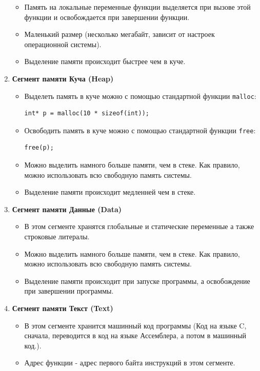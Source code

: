 \documentclass{article}
\begin{document}
\begin{multicols}{2}
\begin{enumerate}
\begin{itemize}
\item Память на локальные переменные функции выделяется при вызове этой функции и освобождается при завершении функции.
\item Маленький размер (несколько мегабайт, зависит от настроек операционной системы).
\item Выделение памяти происходит быстрее чем в куче.
\end{itemize}
\item \textbf{Сегмент памяти Куча (Heap)} \\
\begin{itemize}
\item Выделеть память в куче можно с помощью стандартной функции \texttt{malloc}: \\
\begin{lstlisting}
int* p = malloc(10 * sizeof(int));
\end{lstlisting}
\item Освободить память в куче можно с помощью стандартной функции \texttt{free}:
\begin{lstlisting}
free(p);
\end{lstlisting}
\item Можно выделить намного больше памяти, чем в стеке.
Как правило, можно использовать всю свободную память системы.
\item Выделение памяти происходит медленней чем в стеке.
\end{itemize}
\end{enumerate}
\end{multicols}

\begin{enumerate}
\setcounter{enumi}{2}

\item \textbf{Сегмент памяти Данные (Data)}
\begin{itemize}
\item В этом сегменте хранятся глобальные и статические переменные а также строковые литералы.
\item Можно выделить намного больше памяти, чем в стеке.
Как правило, можно использовать всю свободную память системы.
\item Выделение памяти происходит при запуске программы, а освобождение при завершении программы.
\end{itemize}

\item \textbf{Сегмент памяти Текст (Text)}
\begin{itemize}
\item В этом сегменте хранится машинный код программы (Код на языке C, сначала, переводится в код на языке Ассемблера, а потом в машинный код.).
\item Адрес функции - адрес первого байта инструкций в этом сегменте.
\end{itemize}
\end{enumerate}
\end{document}
